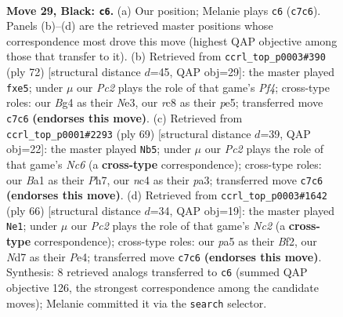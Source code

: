 \documentclass[11pt]{article}
\begin{document}
\clearpage

\begin{figure}[p]\centering
\begin{subfigure}{0.46\textwidth}\centering
\resizebox{\linewidth}{!}{%
\newchessgame
\chessboard[
  setfen={2R5/1ppn1pk1/p7/P3P1p1/1PN1P1b1/8/8/b3KB2 b - - 1 29},
  showmover=false,
  pgfstyle=straightmove, color=movearrow, markmove={c7-c6}
]}
\caption{}
\end{subfigure}\hfill
\begin{subfigure}{0.46\textwidth}\centering
\resizebox{\linewidth}{!}{%
\newchessgame
\chessboard[
  setfen={4bk2/2p1n3/1p2p2p/p3p2P/2P2P2/4NB2/PP1K4/8 w - - 0 37},
  showmover=false,
  pgfstyle=straightmove, color=movearrow, markmove={f4-e5}
]}
\caption{}
\end{subfigure}
\\[4pt]
\begin{subfigure}{0.46\textwidth}\centering
\resizebox{\linewidth}{!}{%
\newchessgame
\chessboard[
  setfen={8/p6p/2Pkbpp1/4p3/4P2P/P1nN4/5PPK/4B3 b - - 0 35},
  showmover=false,
  pgfstyle=straightmove, color=movearrow, markmove={c3-b5}
]}
\caption{}
\end{subfigure}\hfill
\begin{subfigure}{0.46\textwidth}\centering
\resizebox{\linewidth}{!}{%
\newchessgame
\chessboard[
  setfen={2r5/3nbk2/3p3p/R3p3/4Pp1P/1P3P2/2NK1B2/8 w - - 5 34},
  showmover=false,
  pgfstyle=straightmove, color=movearrow, markmove={c2-e1}
]}
\caption{}
\end{subfigure}
\caption{\textbf{Move 29, Black: \texttt{c6}.} (a) Our position; Melanie plays \texttt{c6} (\texttt{c7c6}). Panels (b)--(d) are the retrieved master positions whose correspondence most drove this move (highest QAP objective among those that transfer to it). (b) Retrieved from \texttt{ccrl\_top\_p0003\#390} (ply 72) [structural distance $d$=45, QAP obj=29]: the master played \texttt{fxe5}; under $\mu$ our \emph{Pc2} plays the role of that game's \emph{Pf4}; cross-type roles: our \emph{B}g4 as their \emph{N}e3, our \emph{r}c8 as their \emph{p}e5; transferred move \texttt{c7c6} \textbf{(endorses this move)}. (c) Retrieved from \texttt{ccrl\_top\_p0001\#2293} (ply 69) [structural distance $d$=39, QAP obj=22]: the master played \texttt{Nb5}; under $\mu$ our \emph{Pc2} plays the role of that game's \emph{Nc6} (a \textbf{cross-type} correspondence); cross-type roles: our \emph{B}a1 as their \emph{P}h7, our \emph{n}c4 as their \emph{p}a3; transferred move \texttt{c7c6} \textbf{(endorses this move)}. (d) Retrieved from \texttt{ccrl\_top\_p0003\#1642} (ply 66) [structural distance $d$=34, QAP obj=19]: the master played \texttt{Ne1}; under $\mu$ our \emph{Pc2} plays the role of that game's \emph{Nc2} (a \textbf{cross-type} correspondence); cross-type roles: our \emph{p}a5 as their \emph{B}f2, our \emph{N}d7 as their \emph{P}e4; transferred move \texttt{c7c6} \textbf{(endorses this move)}. Synthesis: 8 retrieved analogs transferred to \texttt{c6} (summed QAP objective 126, the strongest correspondence among the candidate moves); Melanie committed it via the \texttt{search} selector.}
\label{fig:thought-m57}
\end{figure}
\end{document}

